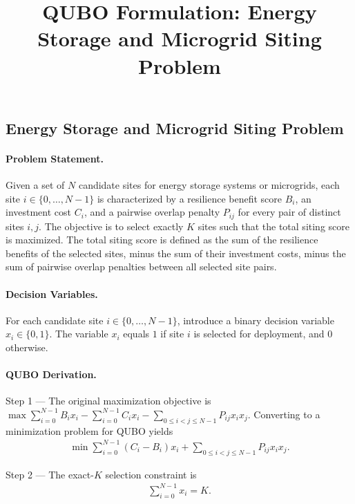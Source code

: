 \documentclass[12pt]{article}
\title{QUBO Formulation: Energy Storage and Microgrid Siting Problem}
\date{}
\begin{document}
\maketitle

\subsection*{Energy Storage and Microgrid Siting Problem}

\paragraph{Problem Statement.}
Given a set of $N$ candidate sites for energy storage systems or microgrids, each site $i \in \{0,\dots,N-1\}$ is characterized by a resilience benefit score $B_i$, an investment cost $C_i$, and a pairwise overlap penalty $P_{ij}$ for every pair of distinct sites $i,j$. The objective is to select exactly $K$ sites such that the total siting score is maximized. The total siting score is defined as the sum of the resilience benefits of the selected sites, minus the sum of their investment costs, minus the sum of pairwise overlap penalties between all selected site pairs.

\paragraph{Decision Variables.}
For each candidate site $i \in \{0,\dots,N-1\}$, introduce a binary decision variable $x_i \in \{0,1\}$. The variable $x_i$ equals $1$ if site $i$ is selected for deployment, and $0$ otherwise.

\paragraph{QUBO Derivation.}
Step 1 --- The original maximization objective is $\max \sum_{i=0}^{N-1} B_i x_i - \sum_{i=0}^{N-1} C_i x_i - \sum_{0 \le i < j \le N-1} P_{ij} x_i x_j$. Converting to a minimization problem for QUBO yields
\begin{align}
  \min \sum_{i=0}^{N-1} (C_i - B_i) x_i + \sum_{0 \le i < j \le N-1} P_{ij} x_i x_j.
\end{align}

Step 2 --- The exact-$K$ selection constraint is
\begin{align}
  \sum_{i=0}^{N-1} x_i = K.
\end{align}
\end{document}
